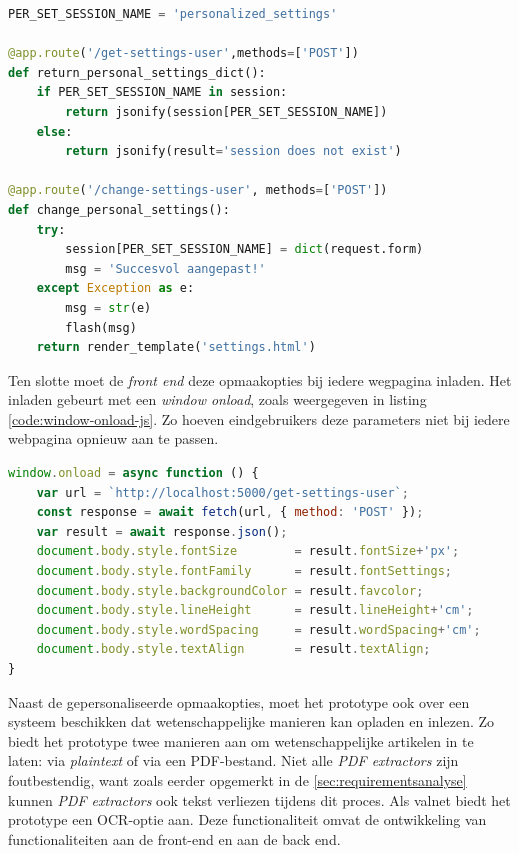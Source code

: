 \begin{lstlisting}[language=python, caption={De back end functie die de aanpassingen uit het formulier opslaat als sessievariabele.}, label={code:back-end-session-personalized}]
PER_SET_SESSION_NAME = 'personalized_settings'

@app.route('/get-settings-user',methods=['POST'])
def return_personal_settings_dict():
	if PER_SET_SESSION_NAME in session:
		return jsonify(session[PER_SET_SESSION_NAME])
	else:
		return jsonify(result='session does not exist')
	
@app.route('/change-settings-user', methods=['POST'])
def change_personal_settings():
	try:
		session[PER_SET_SESSION_NAME] = dict(request.form)
		msg = 'Succesvol aangepast!'
	except Exception as e:
		msg = str(e)
		flash(msg)
	return render_template('settings.html')
\end{lstlisting}

Ten slotte moet de \textit{front end} deze opmaakopties bij iedere wegpagina inladen. Het inladen gebeurt met een \textit{window onload}, zoals weergegeven in listing \ref{code:window-onload-js}. Zo hoeven eindgebruikers deze parameters niet bij iedere webpagina opnieuw aan te passen.

\begin{lstlisting}[language=javascript, caption={De onload-functie die de gepersonaliseerde opmaakopties regelt bij het inladen van een webpagina.}, label={code:window-onload-js}]
window.onload = async function () {
	var url = `http://localhost:5000/get-settings-user`;
	const response = await fetch(url, { method: 'POST' });
	var result = await response.json();
	document.body.style.fontSize        = result.fontSize+'px';
	document.body.style.fontFamily      = result.fontSettings;
	document.body.style.backgroundColor = result.favcolor;
	document.body.style.lineHeight      = result.lineHeight+'cm';
	document.body.style.wordSpacing     = result.wordSpacing+'cm';
	document.body.style.textAlign       = result.textAlign;
}
\end{lstlisting}

Naast de gepersonaliseerde opmaakopties, moet het prototype ook over een systeem beschikken dat wetenschappelijke manieren kan opladen en inlezen. Zo biedt het prototype twee manieren aan om wetenschappelijke artikelen in te laten: via \textit{plaintext} of via een PDF-bestand. Niet alle \textit{PDF extractors} zijn foutbestendig, want zoals eerder opgemerkt in de \ref{sec:requirementsanalyse} kunnen \textit{PDF extractors} ook tekst verliezen tijdens dit proces. Als valnet biedt het prototype een OCR-optie aan. Deze functionaliteit omvat de ontwikkeling van functionaliteiten aan de front-end en aan de back end.

